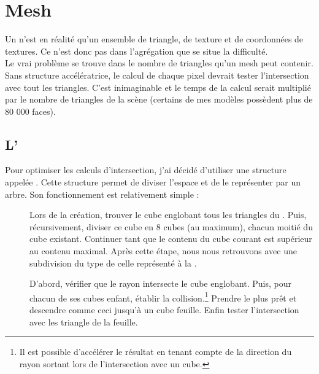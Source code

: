 \section{Mesh}
Un  n'est en réalité qu'un ensemble de triangle, de texture et de
coordonnées de textures. Ce n'est donc pas dans l'agrégation que se situe la
difficulté.\\

Le vrai problème se trouve dans le nombre de triangles qu'un mesh peut
contenir. Sans structure accélératrice, le calcul de chaque pixel devrait
tester l'intersection avec tout les triangles. C'est inimaginable et le temps
de la calcul serait multiplié par le nombre de triangles de la scène (certains
de mes modèles possèdent plus de 80 000 faces).

\subsection{L'}
Pour optimiser les calculs d'intersection, j'ai décidé d'utiliser une structure
appelée . Cette structure permet de diviser l'espace et de le
représenter par un arbre. Son fonctionnement est relativement simple :
\begin{description}
  \item [] Lors de la création, trouver le cube englobant
    tous les triangles du . Puis, récursivement, diviser ce cube en
    8 cubes (au maximum), chacun moitié du cube existant. Continuer tant que
    le contenu du cube courant est supérieur au contenu maximal. Après cette
    étape, nous nous retrouvons avec une subdivision du type de celle
    représenté à la .
  \item [] D'abord, vérifier que le rayon
    intersecte le cube englobant. Puis, pour chacun de ses cubes enfant,
    établir la collision.\footnote{Il est possible d'accélérer le résultat en
    tenant compte de la direction du rayon sortant lors de l'intersection avec
    un cube.} Prendre le plus prêt et descendre comme ceci jusqu'à
    un cube feuille. Enfin tester l'intersection avec les triangle de la
    feuille.
\end{description}

